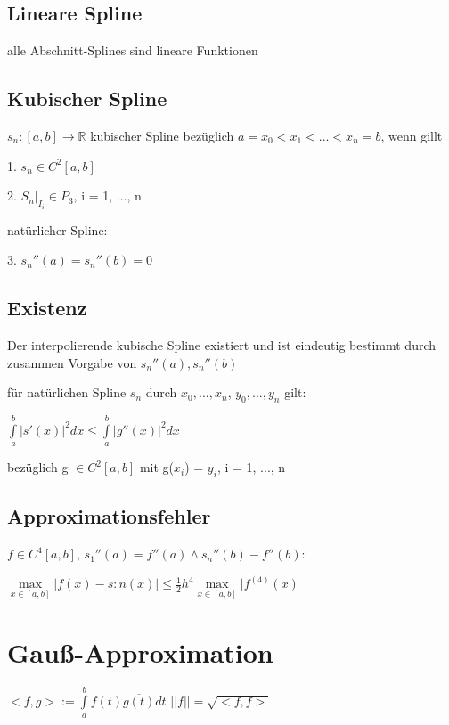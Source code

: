 \documentclass[12pt,a4paper]{article} %
\newcommand*\conj[1]{\overline{#1}}
\newcommand*\tab[1][1cm]{\hspace*{#1}}
\begin{document}
	\subsection{Lineare Spline}
	
	alle Abschnitt-Splines sind lineare Funktionen
	
	\subsection{Kubischer Spline}
	
	$s_n: [a, b] \rightarrow \mathbb{R}$ kubischer Spline bezüglich $a = x_0 < x_1 < ... < x_n = b$, wenn gillt
	
	1. $s_n \in C^2[a, b]$
	
	2. $S_n|_{I_i} \in P_3$, i = 1, ..., n
	
	natürlicher Spline:
	
	3. $s_n''(a) = s_n''(b) = 0$
	
	\subsection{Existenz}
	
	Der interpolierende kubische Spline existiert und ist eindeutig bestimmt durch zusammen Vorgabe von $s_n''(a), s_n''(b)$
	
	für natürlichen Spline $s_n$ durch $x_0, ..., x_n$, $y_0, ..., y_n$ gilt:
	
	\tab $\int\limits_{a}^{b}|s'(x)|^2dx \le \int\limits_{a}^{b}|g''(x)|^2dx$
	
	bezüglich g $\in C^2[a, b]$ mit g($x_i$) = $y_i$, i = 1, ..., n
	
	\subsection{Approximationsfehler}
	
	$f \in C^4[a, b]$, $s_1''(a) = f''(a) \wedge s_n''(b) - f''(b)$:
	
	$\max\limits_{x \in [a, b]}|f(x) - s:n(x)| \le \frac{1}{2}h^4 \max\limits_{x \in [a, b]}|f^{(4)}(x)$
	
	\newpage
	
	\section{Gauß-Approximation}
	
	$<f, g>:= \int\limits_{a}^{b}f(t)\conj{g(t)}dt$ \tab $||f|| = \sqrt{<f, f>}$
	
\end{document}
